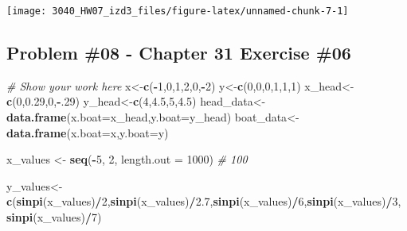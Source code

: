 \documentclass[
]{article}
\newenvironment{Shaded}{\begin{snugshade}}{\end{snugshade}}
\newcommand{\AttributeTok}[1]{\textcolor[rgb]{0.13,0.29,0.53}{#1}}
\newcommand{\CommentTok}[1]{\textcolor[rgb]{0.56,0.35,0.01}{\textit{#1}}}
\newcommand{\DecValTok}[1]{\textcolor[rgb]{0.00,0.00,0.81}{#1}}
\newcommand{\FloatTok}[1]{\textcolor[rgb]{0.00,0.00,0.81}{#1}}
\newcommand{\FunctionTok}[1]{\textcolor[rgb]{0.13,0.29,0.53}{\textbf{#1}}}
\newcommand{\NormalTok}[1]{#1}
\newcommand{\OtherTok}[1]{\textcolor[rgb]{0.56,0.35,0.01}{#1}}
\newcommand{\SpecialCharTok}[1]{\textcolor[rgb]{0.81,0.36,0.00}{\textbf{#1}}}
\begin{document}
\texttt{[image: 3040\_HW07\_izd3\_files/figure-latex/unnamed-chunk-7-1]}

\newpage

\hypertarget{problem-08---chapter-31-exercise-06}{%
\subsection{Problem \#08 - Chapter 31 Exercise
\#06}\label{problem-08---chapter-31-exercise-06}}

\begin{Shaded}
\begin{Highlighting}[]
\CommentTok{\# Show your work here}
\NormalTok{x}\OtherTok{\textless{}{-}}\FunctionTok{c}\NormalTok{(}\SpecialCharTok{{-}}\DecValTok{1}\NormalTok{,}\DecValTok{0}\NormalTok{,}\DecValTok{1}\NormalTok{,}\DecValTok{2}\NormalTok{,}\DecValTok{0}\NormalTok{,}\SpecialCharTok{{-}}\DecValTok{2}\NormalTok{)}
\NormalTok{y}\OtherTok{\textless{}{-}}\FunctionTok{c}\NormalTok{(}\DecValTok{0}\NormalTok{,}\DecValTok{0}\NormalTok{,}\DecValTok{0}\NormalTok{,}\DecValTok{1}\NormalTok{,}\DecValTok{1}\NormalTok{,}\DecValTok{1}\NormalTok{)}
\NormalTok{x\_head}\OtherTok{\textless{}{-}}\FunctionTok{c}\NormalTok{(}\DecValTok{0}\NormalTok{,}\FloatTok{0.29}\NormalTok{,}\DecValTok{0}\NormalTok{,}\SpecialCharTok{{-}}\NormalTok{.}\DecValTok{29}\NormalTok{)}
\NormalTok{y\_head}\OtherTok{\textless{}{-}}\FunctionTok{c}\NormalTok{(}\DecValTok{4}\NormalTok{,}\FloatTok{4.5}\NormalTok{,}\DecValTok{5}\NormalTok{,}\FloatTok{4.5}\NormalTok{)}
\NormalTok{head\_data}\OtherTok{\textless{}{-}}\FunctionTok{data.frame}\NormalTok{(}\AttributeTok{x.boat=}\NormalTok{x\_head,}\AttributeTok{y.boat=}\NormalTok{y\_head)}
\NormalTok{boat\_data}\OtherTok{\textless{}{-}}\FunctionTok{data.frame}\NormalTok{(}\AttributeTok{x.boat=}\NormalTok{x,}\AttributeTok{y.boat=}\NormalTok{y)}



\NormalTok{x\_values }\OtherTok{\textless{}{-}} \FunctionTok{seq}\NormalTok{(}\SpecialCharTok{{-}}\DecValTok{5}\NormalTok{, }\DecValTok{2}\NormalTok{, }\AttributeTok{length.out =} \DecValTok{1000}\NormalTok{)  }\CommentTok{\# 100}

\NormalTok{y\_values}\OtherTok{\textless{}{-}}\FunctionTok{c}\NormalTok{(}\FunctionTok{sinpi}\NormalTok{(x\_values)}\SpecialCharTok{/}\DecValTok{2}\NormalTok{,}\FunctionTok{sinpi}\NormalTok{(x\_values)}\SpecialCharTok{/}\FloatTok{2.7}\NormalTok{,}\FunctionTok{sinpi}\NormalTok{(x\_values)}\SpecialCharTok{/}\DecValTok{6}\NormalTok{,}\FunctionTok{sinpi}\NormalTok{(x\_values)}\SpecialCharTok{/}\DecValTok{3}\NormalTok{,}
            \FunctionTok{sinpi}\NormalTok{(x\_values)}\SpecialCharTok{/}\DecValTok{7}\NormalTok{)}


\end{Highlighting}
\end{Shaded}
\end{document}
